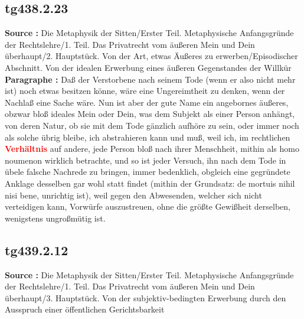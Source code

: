 \documentclass[a4paper,12pt,twoside]{book}
\newcommand{\match}[1]{\textcolor{red}{\textbf{#1}}}
\begin{document}
	\subsection*{tg438.2.23} 
	\textbf{Source : }Die Metaphysik der Sitten/Erster Teil. Metaphysische Anfangsgründe der Rechtslehre/1. Teil. Das Privatrecht vom äußeren Mein und Dein überhaupt/2. Hauptstück. Von der Art, etwas Äußeres zu erwerben/Episodischer Abschnitt. Von der idealen Erwerbung eines äußeren Gegenstandes der Willkür\\  
	
	\textbf{Paragraphe : }Daß der Verstorbene nach seinem Tode (wenn er also nicht mehr ist) noch etwas besitzen könne, wäre eine Ungereimtheit zu denken, wenn der Nachlaß eine Sache wäre. Nun ist aber der gute Name ein angebornes äußeres, obzwar bloß ideales Mein oder Dein, was dem Subjekt als einer Person anhängt, von deren Natur, ob sie mit dem Tode gänzlich aufhöre zu sein, oder immer noch als solche übrig bleibe, ich abstrahieren kann und muß, weil ich, im rechtlichen \match{Verhältnis} auf andere, jede Person bloß nach ihrer Menschheit, mithin als homo noumenon wirklich betrachte, und so ist jeder Versuch, ihn nach dem Tode in übele falsche Nachrede zu bringen, immer bedenklich, obgleich eine gegründete Anklage desselben gar wohl statt findet (mithin der Grundsatz: de mortuis nihil nisi bene, unrichtig ist), weil gegen den Abwesenden, welcher sich nicht verteidigen kann, Vorwürfe auszustreuen, ohne die größte Gewißheit derselben, wenigstens ungroßmütig ist. 
	
	\subsection*{tg439.2.12} 
	\textbf{Source : }Die Metaphysik der Sitten/Erster Teil. Metaphysische Anfangsgründe der Rechtslehre/1. Teil. Das Privatrecht vom äußeren Mein und Dein überhaupt/3. Hauptstück. Von der subjektiv-bedingten Erwerbung durch den Ausspruch einer öffentlichen Gerichtsbarkeit\\  
	
\end{document}
